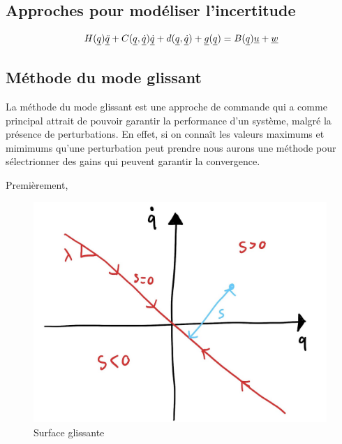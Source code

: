 \subsection{Approches pour modéliser l'incertitude}

\begin{align}
H(\underline{q}) \underline{\ddot{q}} + C(\underline{q},\underline{\dot{q}}) \underline{\dot{q}} + d(\underline{q}, \underline{\dot{q}}) + \underline{g}(\underline{q}) = B(\underline{q}) \underline{u}  + \underline{w}
\end{align}


\subsection{Méthode du mode glissant}

La méthode du mode glissant est une approche de commande qui a comme principal attrait de pouvoir garantir la performance d'un système, malgré la présence de perturbations. En effet, si on connaît les valeurs maximums et mimimums qu'une perturbation peut prendre nous aurons une méthode pour sélectrionner des gains qui peuvent garantir la convergence.


Premièrement, 

\begin{figure}[htp]
	\centering
		\includegraphics[width=0.99\textwidth]{fig/slidingmode.jpg}
	\caption{Surface glissante}
	\label{fig:slidingmode}
\end{figure}


